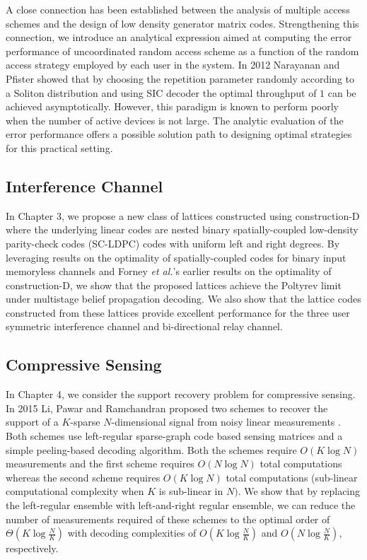 \fi

A close connection has been established between the analysis of multiple access schemes and the design of low density generator matrix codes. Strengthening this connection, we introduce an analytical expression aimed at computing the error performance of uncoordinated random access scheme as a function of the random access strategy employed by each user in the system. In 2012 Narayanan and Pfister showed that by choosing the repetition parameter randomly according to a Soliton distribution and using SIC decoder the optimal throughput of $1$ can be achieved asymptotically\cite{narayanan2012iterative}. However, this paradigm is known to perform poorly when the number of active devices is not large. The analytic evaluation of the error performance offers a possible solution path to designing optimal strategies for this practical setting.

\subsection*{Interference Channel}
In Chapter 3, we propose a new class of lattices constructed using construction-D where the underlying linear codes are nested binary spatially-coupled low-density parity-check codes (SC-LDPC) codes with uniform left and right degrees. By leveraging results on the optimality of spatially-coupled codes for binary input memoryless channels and Forney {\em et al.}'s earlier results on the optimality of construction-D, we show that the proposed lattices achieve the Poltyrev limit under multistage belief propagation decoding. We also show that the lattice codes constructed from these lattices provide excellent performance for the three user symmetric interference channel and bi-directional relay channel. 

\subsection*{Compressive Sensing}
In Chapter 4, we consider the support recovery problem for compressive sensing. In 2015 Li, Pawar and Ramchandran proposed two schemes to recover the support of a $K$-sparse $N$-dimensional signal from noisy linear measurements \cite{li2015subdraft,li2015subisit}. Both schemes use left-regular sparse-graph code based sensing matrices and a simple peeling-based decoding algorithm. Both the schemes require $O(K \log N)$ measurements and the first scheme requires $O(N \log N)$ total computations whereas the second scheme requires $O(K \log N)$ total computations (sub-linear computational complexity when $K$ is sub-linear in $N)$. We show that by replacing the left-regular ensemble with left-and-right regular ensemble, we can reduce the number of measurements required of these schemes to the optimal order of $\Theta\left(K \log \frac{N}{K} \right)$ with decoding complexities of $O(K \log \frac{N}{K})$ and $O(N \log \frac{N}{K})$, respectively.

